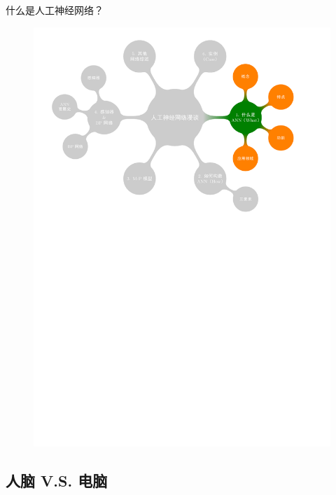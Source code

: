 \documentclass[xcolor=svgnames]{beamer}
\begin{document}
\begin{frame}{什么是人工神经网络？}
  \vspace{-1em}
  \begin{figure}
    \centering
    \includegraphics[width=\textwidth]{mindmap/map2.pdf}
  \end{figure}
\end{frame}

\subsection{人脑 V.S. 电脑}
\end{document}
